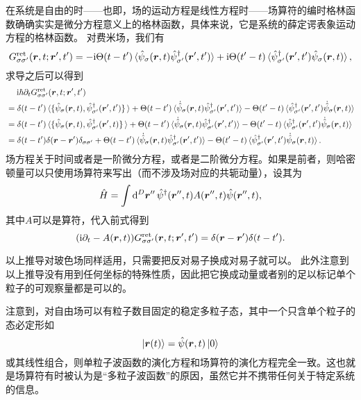 \documentclass[hyperref, UTF8, a4paper]{ctexart}
\newcommand*{\ii}{\mathrm{i}}
\begin{document}
在系统是自由的时——也即，场的运动方程是线性方程时——场算符的编时格林函数确确实实是微分方程意义上的格林函数，具体来说，它是系统的薛定谔表象运动方程的格林函数。
对费米场，我们有
\[
    G_{\sigma \sigma'}^\text{ret} (\vb*{r}, t; \vb*{r}', t') = - \ii \Theta (t-t') \expval*{\hat{\psi}_\sigma (\vb*{r}, t) \hat{\psi}_{\sigma'}^\dagger (\vb*{r}', t')} + \ii \Theta(t'-t) \expval*{\hat{\psi}_{\sigma'}^\dagger(\vb*{r}', t') \hat{\psi}_\sigma (\vb*{r}, t)},
\]
求导之后可以得到
\[
    \begin{aligned}
        &\quad \; \ii \hbar \partial_t G_{\sigma \sigma'}^\text{ret} (\vb*{r}, t; \vb*{r}', t') \\
        &= \delta(t-t') \expval*{\acomm*{\hat{\psi}_\sigma (\vb*{r}, t)}{\hat{\psi}_{\sigma'}^\dagger (\vb*{r}', t')}} + \Theta(t-t') \expval*{\dot{\hat{\psi}}_\sigma (\vb*{r}, t) \hat{\psi}^\dagger_{\sigma'} (\vb*{r}', t')} - \Theta(t'-t) \expval*{\hat{\psi}^\dagger_{\sigma'} (\vb*{r}', t') \dot{\hat{\psi}}_\sigma (\vb*{r}, t)} \\
        &= \delta(t-t') \expval*{\acomm*{\hat{\psi}_\sigma (\vb*{r}, t)}{\hat{\psi}^\dagger_{\sigma'} (\vb*{r}', t)}} + \Theta(t-t') \expval*{\dot{\hat{\psi}}_\sigma (\vb*{r}, t) \hat{\psi}^\dagger_{\sigma'} (\vb*{r}', t')} - \Theta(t'-t) \expval*{\hat{\psi}^\dagger_{\sigma'} (\vb*{r}', t') \dot{\hat{\psi}}_\sigma (\vb*{r}, t)} \\
        &= \delta(t-t') \delta(\vb*{r} - \vb*{r}') \delta_{\sigma \sigma'} + \Theta(t-t') \expval*{\dot{\hat{\psi}}_\sigma (\vb*{r}, t) \hat{\psi}^\dagger_{\sigma'} (\vb*{r}', t')} - \Theta(t'-t) \expval*{\hat{\psi}^\dagger_{\sigma'} (\vb*{r}', t') \dot{\hat{\psi}}_\sigma (\vb*{r}, t)}.
    \end{aligned}
\]
场方程关于时间或者是一阶微分方程，或者是二阶微分方程。如果是前者，则哈密顿量可以只使用场算符来写出（而不涉及场对应的共轭动量），设其为
\[
    \hat{H} = \int \dd[D]{\vb*{r}''} \hat{\psi}^\dagger (\vb*{r}'', t) A(\vb*{r}'', t) \hat{\psi}(\vb*{r}'', t),
\]
其中$A$可以是算符，代入前式得到
\[
    (\ii \partial_t - A(\vb*{r}, t)) G_{\sigma \sigma'}^\text{ret} (\vb*{r}, t; \vb*{r}', t') = \delta(\vb*{r} - \vb*{r}') \delta(t-t').
\]

以上推导对玻色场同样适用，只需要把反对易子换成对易子就可以。
此外注意到以上推导没有用到任何坐标的特殊性质，因此把它换成动量或者别的足以标记单个粒子的可观察量都是可以的。

注意到，对自由场可以有粒子数目固定的稳定多粒子态，其中一个只含单个粒子的态必定形如
\[
    \ket{\vb*{r} (t)} = \hat{\psi}(\vb*{r}, t) \ket{0}
\]
或其线性组合，则单粒子波函数的演化方程和场算符的演化方程完全一致。这也就是场算符有时被认为是“多粒子波函数”的原因，虽然它并不携带任何关于特定系统的信息。
\end{document}
